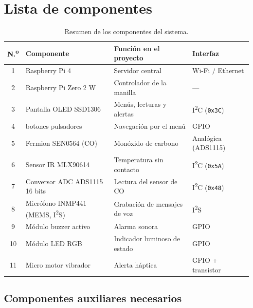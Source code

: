 \documentclass[11pt,a4paper]{article}
\begin{document}
\section{Lista de componentes}

\begin{table}[H]
\centering
\small
\begin{tabularx}{\textwidth}{@{}c>{\raggedright\arraybackslash}p{4.1cm}X>{\raggedright\arraybackslash}p{2.9cm}@{}}
\toprule
\textbf{N.\textsuperscript{o}} & \textbf{Componente} & \textbf{Función en el proyecto} & \textbf{Interfaz} \\
\midrule
1  & Raspberry Pi 4                       & Servidor central                          & Wi-Fi / Ethernet \\
2  & Raspberry Pi Zero 2 W                & Controlador de la manilla                 & --- \\
3  & Pantalla OLED SSD1306                & Menús, lecturas y alertas                 & I\textsuperscript{2}C (\texttt{0x3C}) \\
4  & 3 botones pulsadores                 & Navegación por el menú                    & 3 GPIO \\
5  & Fermion SEN0564 (CO)                 & Monóxido de carbono                       & Analógica (ADS1115) \\
6  & Sensor IR MLX90614                   & Temperatura sin contacto                  & I\textsuperscript{2}C (\texttt{0x5A}) \\
7  & Conversor ADC ADS1115 16 bits        & Lectura del sensor de CO                  & I\textsuperscript{2}C (\texttt{0x48}) \\
8  & Micrófono INMP441 (MEMS, I\textsuperscript{2}S) & Grabación de mensajes de voz  & I\textsuperscript{2}S \\
9  & Módulo buzzer activo                 & Alarma sonora                             & 1 GPIO \\
10 & Módulo LED RGB                       & Indicador luminoso de estado              & 3 GPIO \\
11 & Micro motor vibrador                 & Alerta háptica                            & 1 GPIO + transistor \\
\bottomrule
\end{tabularx}
\caption{Resumen de los componentes del sistema.}
\end{table}

\subsection*{Componentes auxiliares necesarios}
\end{document}
